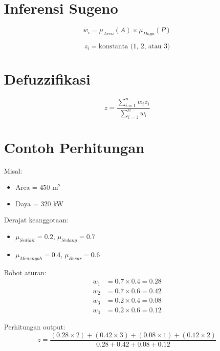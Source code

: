 \documentclass{article}
\begin{document}
\section{Inferensi Sugeno}

\begin{equation}
w_i = \mu_{Area}(A) \times \mu_{Daya}(P)
\end{equation}

\begin{equation}
z_i = \text{konstanta (1, 2, atau 3)}
\end{equation}

\section{Defuzzifikasi}

\begin{equation}
z = \frac{\sum_{i=1}^{n} w_i z_i}{\sum_{i=1}^{n} w_i}
\end{equation}

\section{Contoh Perhitungan}

Misal:
\begin{itemize}
    \item Area = 450 m$^2$
    \item Daya = 320 kW
\end{itemize}

Derajat keanggotaan:
\begin{itemize}
    \item $\mu_{Sedikit} = 0.2$, $\mu_{Sedang} = 0.7$
    \item $\mu_{Menengah} = 0.4$, $\mu_{Besar} = 0.6$
\end{itemize}

Bobot aturan:
\begin{align*}
w_1 &= 0.7 \times 0.4 = 0.28 \\
w_2 &= 0.7 \times 0.6 = 0.42 \\
w_3 &= 0.2 \times 0.4 = 0.08 \\
w_4 &= 0.2 \times 0.6 = 0.12
\end{align*}

Perhitungan output:
\begin{equation}
z = \frac{(0.28 \times 2) + (0.42 \times 3) + (0.08 \times 1) + (0.12 \times 2)}{0.28 + 0.42 + 0.08 + 0.12}
\end{equation}
\end{document}

